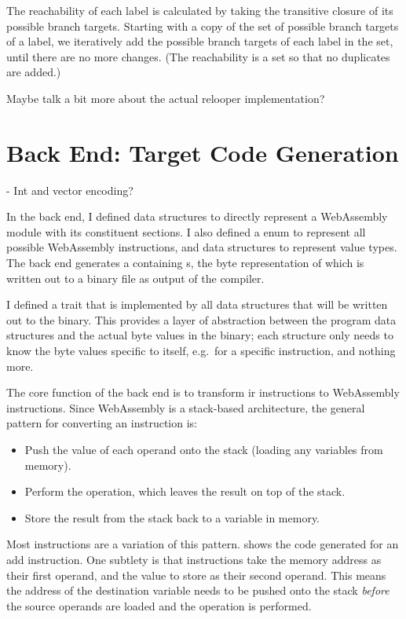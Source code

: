 \documentclass[00-main.tex]{subfiles}
\begin{document}
The reachability of each label is calculated by taking the transitive closure of its possible branch targets.
Starting with a copy of the set of possible branch targets of a label, we iteratively add the possible branch targets of each label in the set, until there are no more changes.
(The reachability is a set so that no duplicates are added.)

\begin{mrwComment}
  Maybe talk a bit more about the actual relooper implementation?
\end{mrwComment}

\section{Back End: Target Code Generation}

\begin{mrwComment}
- Int and vector encoding?
\end{mrwComment}

In the back end, I defined data structures to directly represent a WebAssembly module with its constituent sections.
I also defined a  enum to represent all possible WebAssembly instructions, and data structures to represent value types.
The back end generates a  containing s, the byte representation of which is written out to a binary file as output of the compiler.

I defined a  trait that is implemented by all data structures that will be written out to the binary.
This provides a layer of abstraction between the program data structures and the actual byte values in the binary; each structure only needs to know the byte values specific to itself, e.g.\ for a specific instruction, and nothing more.

The core function of the back end is to transform \gls{ir} instructions to WebAssembly instructions.
Since WebAssembly is a stack-based architecture, the general pattern for converting an instruction is:
\begin{itemize}[nosep]
\item Push the value of each operand onto the stack (loading any variables from memory).
\item Perform the operation, which leaves the result on top of the stack.
\item Store the result from the stack back to a variable in memory.
\end{itemize}
Most instructions are a variation of this pattern.
 shows the code generated for an add instruction.
One subtlety is that  instructions take the memory address as their first operand, and the value to store as their second operand.
This means the address of the destination variable needs to be pushed onto the stack \emph{before} the source operands are loaded and the operation is performed.
\end{document}
